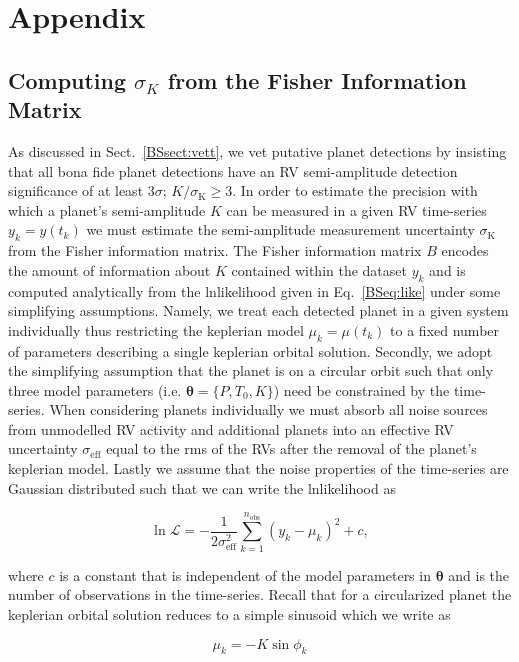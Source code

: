 \section{Appendix}
\subsection{Computing $\sigma_K$ from the Fisher Information Matrix} \label{app:fisher}
As discussed in Sect.~\ref{BSsect:vett}, we vet putative planet detections by insisting that
all bona fide planet detections have an RV semi-amplitude detection significance of at least
$3\sigma$; $K/\sigma_{\text{K}} \geq 3$. 
In order to estimate the precision with which a planet's semi-amplitude $K$ can be measured 
in a given RV time-series $y_k=y(t_k)$ we must estimate the semi-amplitude measurement
uncertainty $\sigma_{\text{K}}$ from the Fisher information matrix. The Fisher information matrix $B$
encodes the amount of information about $K$ contained within the dataset $y_k$ and is computed
analytically
from the lnlikelihood given in Eq.~\ref{BSeq:like} under some simplifying assumptions. Namely,
we treat each detected planet in a given system individually thus restricting the keplerian
model $\mu_k=\mu(t_k)$ to a fixed number of parameters describing a single keplerian orbital
solution. Secondly, we adopt the simplifying assumption that the planet is on a circular
orbit such that only three model parameters (i.e. $\boldsymbol{\theta}=\{P,T_0,K\}$) need be
constrained by the time-series. When considering planets individually we
must absorb all noise sources from unmodelled RV activity and additional planets
into an effective RV uncertainty $\sigma_{\text{eff}}$ equal to the rms of the RVs after the
removal of the planet's keplerian model. Lastly we assume that the noise properties of the
time-series are Gaussian distributed such that we can write the lnlikelihood as

\begin{equation}
  \ln{\mathcal{L}} = -\frac{1}{2\sigma_{\text{eff}}^2} \sum_{k=1}^{n_{\text{obs}}} (y_k - \mu_k)^2 + c, \label{BSeq:ll2}
\end{equation}

\noindent where $c$ is a constant that is independent of the model parameters in $\boldsymbol{\theta}$
and \nobs{} is the number of observations in the time-series.
Recall that for a circularized planet the keplerian orbital solution reduces to a simple sinusoid which
we write as

\begin{equation}
  \mu_k = -K \sin{\phi_k} \label{BSeq:kep}
\end{equation}

